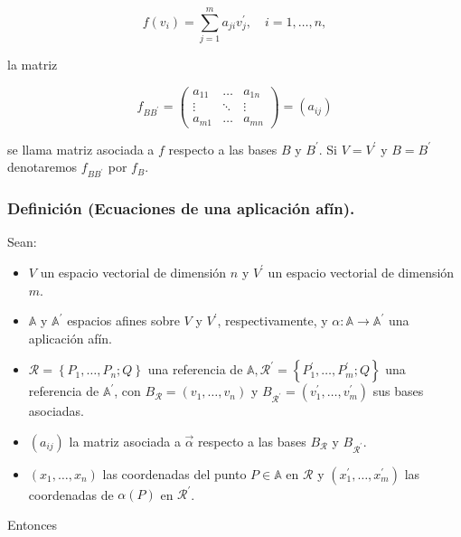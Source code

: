 \documentclass[12pt, a4paper, ones, notitlepage, openany,titlepage]{article}
\begin{document}
$$
f\left(v_{i}\right)=\sum_{j=1}^{m} a_{j i} v_{j}^{\prime}, \quad i=1, \ldots, n,
$$

la matriz

$$
f_{B B^{\prime}}=\left(\begin{array}{rrr}
a_{11} & \ldots & a_{1 n} \\
\vdots & \ddots & \vdots \\
a_{m 1} & \ldots & a_{m n}
\end{array}\right)=\left(a_{i j}\right)
$$

se llama matriz asociada a $f$ respecto a las bases $B$ y $B^{\prime}$. Si $V=V^{\prime}$ y $B=B^{\prime}$ denotaremos $f_{B B^{\prime}}$ por $f_{B}$.

\subsubsection{Definición (Ecuaciones de una aplicación afín).} Sean:

\begin{itemize}

\item$V$ un espacio vectorial de dimensión $n$ y $V^{\prime}$ un espacio vectorial de dimensión $m$.
\item$\mathbb{A}$ y $\mathbb{A}^{\prime}$ espacios afines sobre $V$ y $V^{\prime}$, respectivamente, y $\alpha: \mathbb{A} \rightarrow \mathbb{A}^{\prime}$ una aplicación afín.
\item$\mathcal{R}=\left\{P_{1}, \ldots, P_{n} ; Q\right\}$ una referencia de $\mathbb{A}, \mathcal{R}^{\prime}=\left\{P_{1}^{\prime}, \ldots, P_{m}^{\prime} ; Q\right\}$ una referencia de $\mathbb{A}^{\prime}$, con $B_{\mathcal{R}}=\left(v_{1}, \ldots, v_{n}\right)$ y $B_{\mathcal{R}^{\prime}}=\left(v_{1}^{\prime}, \ldots, v_{m}^{\prime}\right)$ sus bases asociadas.

\item$\left(a_{i j}\right)$ la matriz asociada a $\vec{\alpha}$ respecto a las bases $B_{\mathcal{R}}$ y $B_{\mathcal{R}^{\prime}}$. \item$\left(x_{1}, \ldots, x_{n}\right)$ las coordenadas del punto $P \in \mathbb{A}$ en $\mathcal{R}$ y $\left(x_{1}^{\prime}, \ldots, x_{m}^{\prime}\right)$ las coordenadas de $\alpha(P)$ en $\mathcal{R}^{\prime}$.

\end{itemize}

Entonces
\end{document}
